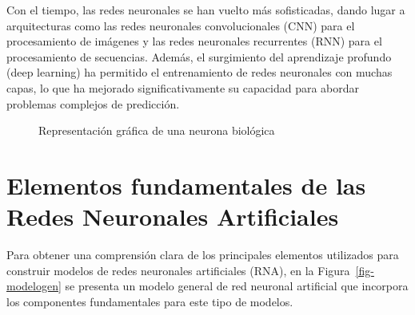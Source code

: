 \documentclass[
  us-letterpaper,
]{scrreprt}
\theoremstyle{plain}
\theoremstyle{definition}
\theoremstyle{plain}
\theoremstyle{definition}
\theoremstyle{remark}
\begin{document}
Con el tiempo, las redes neuronales se han vuelto más sofisticadas,
dando lugar a arquitecturas como las redes neuronales convolucionales
(CNN) para el procesamiento de imágenes y las redes neuronales
recurrentes (RNN) para el procesamiento de secuencias. Además, el
surgimiento del aprendizaje profundo (deep learning) ha permitido el
entrenamiento de redes neuronales con muchas capas, lo que ha mejorado
significativamente su capacidad para abordar problemas complejos de
predicción.

\begin{figure}


\caption{\label{fig-neubio}Representación gráfica de una neurona
biológica}

\end{figure}%

\section{Elementos fundamentales de las Redes Neuronales
Artificiales}\label{elementos-fundamentales-de-las-redes-neuronales-artificiales}

Para obtener una comprensión clara de los principales elementos
utilizados para construir modelos de redes neuronales artificiales
(RNA), en la Figura~\ref{fig-modelogen} se presenta un modelo general de
red neuronal artificial que incorpora los componentes fundamentales para
este tipo de modelos.
\end{document}
